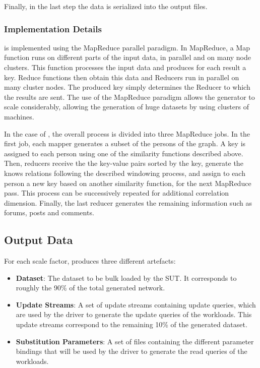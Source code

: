 Finally, in the last step the data is serialized into the output files.

\subsubsection{Implementation Details}

\datagen is implemented using the MapReduce parallel paradigm. In MapReduce, a
Map function runs on different parts of the input data, in parallel and on many
node clusters. This function processes the input data and produces for each
result a key. Reduce functions then obtain this data and Reducers run in
parallel on many cluster nodes. The produced key simply determines the Reducer
to which the results are sent. The use of the MapReduce paradigm allows the
generator to scale considerably, allowing the generation of huge datasets by
using clusters of machines.

In the case of \datagen, the overall process is divided into three MapReduce jobs.
In the first job, each mapper generates a subset of the persons of the graph. A
key is assigned to each person using one of the similarity functions described
above. Then, reducers receive the the key-value pairs sorted by the key,
generate the knows relations following the described windowing process, and
assign to each person a new key based on another similarity function, for the
next MapReduce pass.  This process can be successively repeated for additional
correlation dimension.  Finally, the last reducer generates the remaining
information such as forums, posts and comments.

\subsection{Output Data}

For each scale factor, \datagen produces three different artefacts:
\begin{itemize}
  \item \textbf{Dataset}: The dataset to be bulk loaded by the SUT. It
    corresponds to roughly the 90\% of the total generated network.
  \item \textbf{Update Streams}: A set of update streams containing update
    queries, which are used by the driver to generate the update queries of the
    workloads. This update
    streams correspond to the remaining 10\% of the generated dataset.
  \item \textbf{Substitution Parameters}: A set of files containing the
    different parameter bindings that will be used by the driver to generate the
    read queries of the workloads.
\end{itemize}

